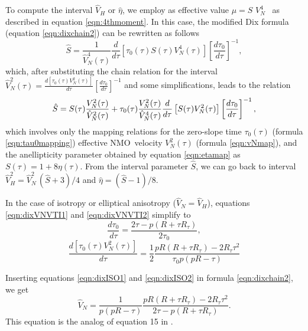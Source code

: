 To compute the interval $\hat{V}_H$ or $\hat{\eta}$, we employ as
effective value ${\mu =}S$ $V_{N}^{4}$ \ as described in equation
\ref{eqn:4thmoment}. In this case, the modified Dix formula (equation
\ref{eqn:dixchain2}) can be rewritten as follows
\begin{equation}
\hat{S}=\frac{1}{{\hat{V}_{N}^{4}(\tau )}}\frac{d}{{d\tau }}\left[ {\tau
_{0}(\tau )S(\tau )V_{N}^{4}(\tau )}\right] \left[ \frac{d{\tau }_{0}}{{d\tau }}\right] ^{-1},  
\label{eqn:dixchainETA}
\end{equation}
which, after substituting the chain relation for the interval
${\hat{V}_{N}^{2}(\tau )=}\frac{{d\left[ {\tau _{0}(\tau
)V_{N}^{2}(\tau )}\right] }}{{d\tau }}\left[ \frac{d{\tau
}_{0}}{{d\tau }}\right] ^{-1}$ and some simplifications, leads to
the relation	
\begin{equation}
\hat{S}={S(\tau )}\frac{{V_{N}^{2}(\tau )}}{{\hat{V}_{N}^{2}(\tau )}}+\tau
_{0}(\tau )\frac{{V_{N}^{2}(\tau )}}{{\hat{V}_{N}^{4}(\tau )}}\frac{{d}}{{%
d\tau }}\left[ {S(\tau )V_{N}^{2}(\tau )}\right] \left[ \frac{d{\tau }_{0}}{{%
d\tau }}\right] ^{-1},  \label{eqn:etaDIX}
\end{equation}
which involves only the mapping relations for the zero-slope time
$\tau _{0}(\tau)$ (formula \ref{eqn:tau0mapping}) effective NMO\
velocity $V_{N}^{2}(\tau )$ (formula \ref{eqn:vNmap}), and the
anellipticity parameter obtained by equation \ref{eqn:etamap} as
$S(\tau )=1+8\eta (\tau )$. From the interval parameter $\hat{S}$, we
can go back to interval
$\hat{V}_{H}^{2}=\hat{V}_{N}^{2}\,(\hat{S}+3)/4$ and
$\hat{\eta}=(\hat{S}-1)/8$.

In the case of isotropy or elliptical anisotropy ($\hat{V}_{N}=\hat{V}_{H}$), equations \ref{eqn:dixVNVTI1} and
\ref{eqn:dixVNVTI2} simplify to
\begin{equation}
\frac{{d\tau _{0}}}{{d\tau }}=\frac{{2\tau -p(R+\tau R_{\tau })}}{{2\tau _{0}%
}},  \label{eqn:dixISO1}
\end{equation}%
\begin{equation}
\frac{{d\left[ {\tau _{0}(\tau )V_{N}^{2}(\tau )}\right] }}{{d\tau }}=\frac{1%
}{2}\frac{{pR(R+\tau R_{\tau })-2R_{\tau }\tau ^{2}}}{{\tau _{0}p(pR-\tau )}}%
\label{eqn:dixISO2}
\end{equation}

Inserting equations \ref{eqn:dixISO1} and \ref{eqn:dixISO2} in
formula \ref{eqn:dixchain2}, we get
\begin{equation}
\hat{V}_{N}=\frac{1}{{p(pR-\tau )}}\frac{{pR(R+\tau R_{\tau })-2R_{\tau
}\tau ^{2}}}{{{2\tau -p(R+\tau R_{\tau })}}}.  \label{eqn:vNdixISO}
\end{equation}
This equation is the analog of equation 15 in \citep{fomel:2046}.

